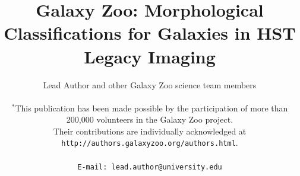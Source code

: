 \documentclass[usenatbib]{mn2e}
\begin{document}
\title[Galaxy Zoo Hubble Data]{Galaxy Zoo: Morphological Classifications for Galaxies in HST Legacy Imaging}
\author[Lead Author \etal]{Lead Author and other Galaxy Zoo science team members\\
%
%
\\
 $^*$This publication has been made possible by the participation of more than 200,000 volunteers in the Galaxy Zoo project. \\ Their contributions are individually acknowledged at \texttt{http://authors.galaxyzoo.org/authors.html}. \\
\\
{\tt E-mail: lead.author@university.edu}
 }
\end{document}
